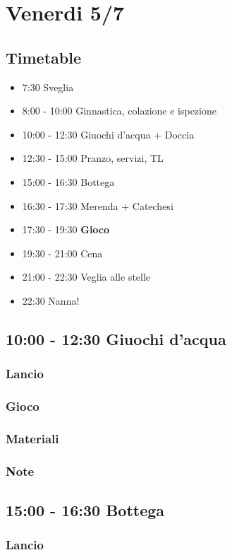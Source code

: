 \documentclass[../main.tex]{subfiles}
\begin{document}
   \section{Venerdi 5/7}
   \subsection{Timetable}
   \begin{itemize}
        \item 7:30 Sveglia
        \item 8:00 - 10:00 Ginnastica, colazione e ispezione
        \item 10:00 - 12:30 Giuochi d'acqua + Doccia
        \item 12:30 - 15:00 Pranzo, servizi, TL
        \item 15:00 - 16:30 Bottega
        \item 16:30 - 17:30 Merenda + Catechesi
        \item 17:30 - 19:30 \textbf{Gioco}
        \item 19:30 - 21:00 Cena
        \item 21:00 - 22:30 Veglia alle stelle
        \item 22:30 Nanna!
    \end{itemize}

   \subsection{10:00 - 12:30 Giuochi d'acqua}
       \subsubsection{Lancio}
        \subsubsection{Gioco}
        \subsubsection{Materiali}
        \subsubsection{Note}

    \subsection{15:00 - 16:30 Bottega}
        \subsubsection{Lancio}
\end{document}
